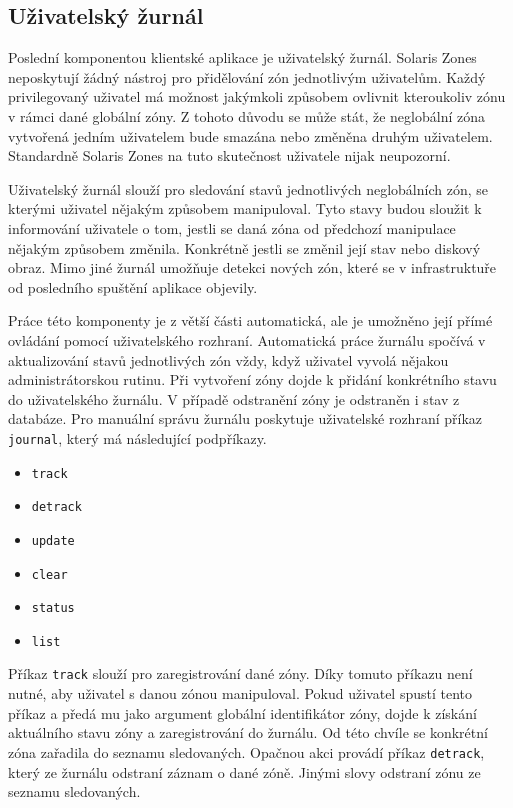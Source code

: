 \subsection{Uživatelský žurnál}
\label{chapter:implementation:client:journal}
Poslední komponentou klientské aplikace je uživatelský žurnál. Solaris Zones neposkytují žádný nástroj pro přidělování zón 
jednotlivým uživatelům. Každý privilegovaný uživatel má možnost jakýmkoli způsobem ovlivnit kteroukoliv zónu v rámci dané globální
zóny. Z tohoto důvodu se může stát, že neglobální zóna vytvořená jedním uživatelem bude smazána nebo změněna druhým uživatelem.
Standardně Solaris Zones na tuto skutečnost uživatele nijak neupozorní. 

Uživatelský žurnál slouží pro sledování stavů jednotlivých neglobálních zón, se kterými uživatel nějakým způsobem manipuloval.
Tyto stavy budou sloužit k informování uživatele o tom, jestli se daná zóna od předchozí manipulace nějakým způsobem změnila.
Konkrétně jestli se změnil její stav nebo diskový obraz. Mimo jiné žurnál umožňuje detekci nových zón, které se v infrastruktuře
od posledního spuštění aplikace objevily.

Práce této komponenty je z větší části automatická, ale je umožněno její přímé ovládání pomocí uživatelského rozhraní. Automatická
práce žurnálu spočívá v aktualizování stavů jednotlivých zón vždy, když uživatel vyvolá nějakou administrátorskou rutinu. Při vytvoření
zóny dojde k přidání konkrétního stavu do uživatelského žurnálu. V případě odstranění zóny je odstraněn i stav z databáze. Pro 
manuální správu žurnálu poskytuje uživatelské rozhraní příkaz \verb|journal|, který má následující podpříkazy.
\begin{itemize}
 \item \verb|track|
 \item \verb|detrack|
 \item \verb|update|
 \item \verb|clear|
 \item \verb|status|
 \item \verb|list|
\end{itemize}
Příkaz \verb|track| slouží pro zaregistrování dané zóny. Díky tomuto příkazu není nutné, aby uživatel s danou zónou manipuloval.
Pokud uživatel spustí tento příkaz a předá mu jako argument globální identifikátor zóny, dojde k získání aktuálního stavu zóny
a zaregistrování do žurnálu. Od této chvíle se konkrétní zóna zařadila do seznamu sledovaných. Opačnou akci provádí příkaz
\verb|detrack|, který ze žurnálu odstraní záznam o dané zóně. Jinými slovy odstraní zónu ze seznamu sledovaných.

